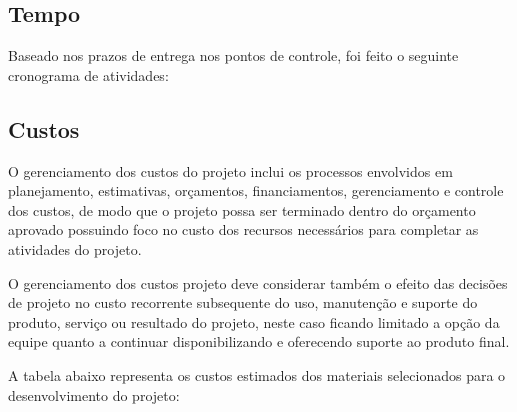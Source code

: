 \subsection{Tempo}

Baseado nos prazos de entrega nos pontos de controle, foi feito o seguinte cronograma de atividades:

\subsection{Custos}

O gerenciamento dos custos do projeto inclui os processos envolvidos em planejamento, estimativas, orçamentos, financiamentos, gerenciamento e controle dos custos, de modo que o projeto possa ser terminado dentro do orçamento aprovado possuindo foco no custo dos recursos necessários para completar as atividades do projeto.

O gerenciamento dos custos projeto deve considerar também o efeito das decisões de projeto no custo recorrente subsequente do uso, manutenção e suporte do produto, serviço ou resultado do projeto, neste caso ficando limitado a opção da equipe quanto a continuar disponibilizando e oferecendo suporte ao produto final.

A tabela abaixo representa os custos estimados dos materiais selecionados para o desenvolvimento do projeto:

